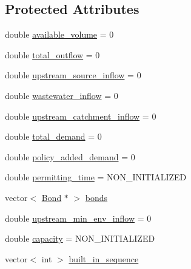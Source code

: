 \subsection*{Protected Attributes}
\begin{DoxyCompactItemize}
\item 
double \mbox{\hyperlink{classWaterSource_a49e1a191152e344e2161e8db166e067a_a49e1a191152e344e2161e8db166e067a}{available\+\_\+volume}} = 0
\item 
double \mbox{\hyperlink{classWaterSource_a5e6992931464ed75576326b9f1bd3c4f_a5e6992931464ed75576326b9f1bd3c4f}{total\+\_\+outflow}} = 0
\item 
double \mbox{\hyperlink{classWaterSource_a7a69b2e9b6030f1035e6cf44d2918ee5_a7a69b2e9b6030f1035e6cf44d2918ee5}{upstream\+\_\+source\+\_\+inflow}} = 0
\item 
double \mbox{\hyperlink{classWaterSource_aeb5a2d2d83383a70ca20f3e94635a9c7_aeb5a2d2d83383a70ca20f3e94635a9c7}{wastewater\+\_\+inflow}} = 0
\item 
double \mbox{\hyperlink{classWaterSource_aceb2d77612db7ba71a171848a5e03b4f_aceb2d77612db7ba71a171848a5e03b4f}{upstream\+\_\+catchment\+\_\+inflow}} = 0
\item 
double \mbox{\hyperlink{classWaterSource_a1934917dd35a2508a5102eb5831431b7_a1934917dd35a2508a5102eb5831431b7}{total\+\_\+demand}} = 0
\item 
double \mbox{\hyperlink{classWaterSource_a3f04ae75d6235117d391dece2d323890_a3f04ae75d6235117d391dece2d323890}{policy\+\_\+added\+\_\+demand}} = 0
\item 
double \mbox{\hyperlink{classWaterSource_a036d7980e74224fd5f5c6a390e0d5abb_a036d7980e74224fd5f5c6a390e0d5abb}{permitting\+\_\+time}} = N\+O\+N\+\_\+\+I\+N\+I\+T\+I\+A\+L\+I\+Z\+ED
\item 
vector$<$ \mbox{\hyperlink{classBond}{Bond}} $\ast$ $>$ \mbox{\hyperlink{classWaterSource_a413b094e11bdce62f4d82e5bb9e4706e_a413b094e11bdce62f4d82e5bb9e4706e}{bonds}}
\item 
double \mbox{\hyperlink{classWaterSource_a67165e29345b61f36c8d8ccf3f648819_a67165e29345b61f36c8d8ccf3f648819}{upstream\+\_\+min\+\_\+env\+\_\+inflow}} = 0
\item 
double \mbox{\hyperlink{classWaterSource_a2ec257b415b248214a8bce7fc5267723_a2ec257b415b248214a8bce7fc5267723}{capacity}} = N\+O\+N\+\_\+\+I\+N\+I\+T\+I\+A\+L\+I\+Z\+ED
\item 
vector$<$ int $>$ \mbox{\hyperlink{classWaterSource_a49f9da70a5080abe82160b1a0d194e60_a49f9da70a5080abe82160b1a0d194e60}{built\+\_\+in\+\_\+sequence}}

\end{DoxyCompactItemize}
